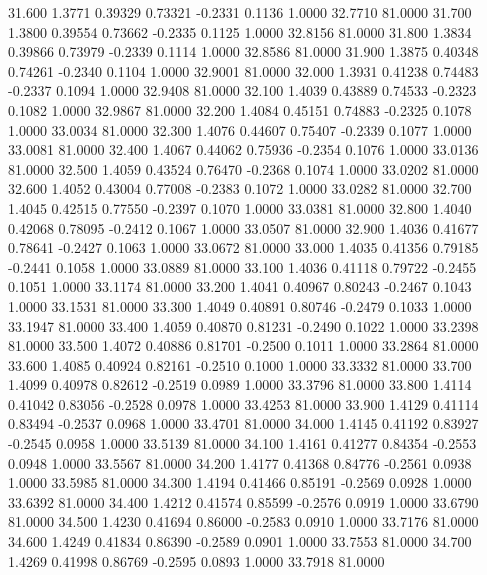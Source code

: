   31.600   1.3771   0.39329   0.73321  -0.2331   0.1136   1.0000  32.7710  81.0000
  31.700   1.3800   0.39554   0.73662  -0.2335   0.1125   1.0000  32.8156  81.0000
  31.800   1.3834   0.39866   0.73979  -0.2339   0.1114   1.0000  32.8586  81.0000
  31.900   1.3875   0.40348   0.74261  -0.2340   0.1104   1.0000  32.9001  81.0000
  32.000   1.3931   0.41238   0.74483  -0.2337   0.1094   1.0000  32.9408  81.0000
  32.100   1.4039   0.43889   0.74533  -0.2323   0.1082   1.0000  32.9867  81.0000
  32.200   1.4084   0.45151   0.74883  -0.2325   0.1078   1.0000  33.0034  81.0000
  32.300   1.4076   0.44607   0.75407  -0.2339   0.1077   1.0000  33.0081  81.0000
  32.400   1.4067   0.44062   0.75936  -0.2354   0.1076   1.0000  33.0136  81.0000
  32.500   1.4059   0.43524   0.76470  -0.2368   0.1074   1.0000  33.0202  81.0000
  32.600   1.4052   0.43004   0.77008  -0.2383   0.1072   1.0000  33.0282  81.0000
  32.700   1.4045   0.42515   0.77550  -0.2397   0.1070   1.0000  33.0381  81.0000
  32.800   1.4040   0.42068   0.78095  -0.2412   0.1067   1.0000  33.0507  81.0000
  32.900   1.4036   0.41677   0.78641  -0.2427   0.1063   1.0000  33.0672  81.0000
  33.000   1.4035   0.41356   0.79185  -0.2441   0.1058   1.0000  33.0889  81.0000
  33.100   1.4036   0.41118   0.79722  -0.2455   0.1051   1.0000  33.1174  81.0000
  33.200   1.4041   0.40967   0.80243  -0.2467   0.1043   1.0000  33.1531  81.0000
  33.300   1.4049   0.40891   0.80746  -0.2479   0.1033   1.0000  33.1947  81.0000
  33.400   1.4059   0.40870   0.81231  -0.2490   0.1022   1.0000  33.2398  81.0000
  33.500   1.4072   0.40886   0.81701  -0.2500   0.1011   1.0000  33.2864  81.0000
  33.600   1.4085   0.40924   0.82161  -0.2510   0.1000   1.0000  33.3332  81.0000
  33.700   1.4099   0.40978   0.82612  -0.2519   0.0989   1.0000  33.3796  81.0000
  33.800   1.4114   0.41042   0.83056  -0.2528   0.0978   1.0000  33.4253  81.0000
  33.900   1.4129   0.41114   0.83494  -0.2537   0.0968   1.0000  33.4701  81.0000
  34.000   1.4145   0.41192   0.83927  -0.2545   0.0958   1.0000  33.5139  81.0000
  34.100   1.4161   0.41277   0.84354  -0.2553   0.0948   1.0000  33.5567  81.0000
  34.200   1.4177   0.41368   0.84776  -0.2561   0.0938   1.0000  33.5985  81.0000
  34.300   1.4194   0.41466   0.85191  -0.2569   0.0928   1.0000  33.6392  81.0000
  34.400   1.4212   0.41574   0.85599  -0.2576   0.0919   1.0000  33.6790  81.0000
  34.500   1.4230   0.41694   0.86000  -0.2583   0.0910   1.0000  33.7176  81.0000
  34.600   1.4249   0.41834   0.86390  -0.2589   0.0901   1.0000  33.7553  81.0000
  34.700   1.4269   0.41998   0.86769  -0.2595   0.0893   1.0000  33.7918  81.0000
